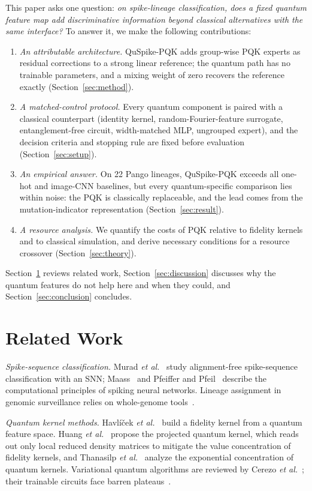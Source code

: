 \documentclass[conference]{IEEEtran}
\begin{document}
This paper asks one question: \emph{on spike-lineage classification, does a fixed quantum feature map add discriminative information beyond classical alternatives with the same interface?} To answer it, we make the following contributions:
\begin{enumerate}
    \item \textit{An attributable architecture.} QuSpike-PQK adds group-wise PQK experts as residual corrections to a strong linear reference; the quantum path has no trainable parameters, and a mixing weight of zero recovers the reference exactly (Section~\ref{sec:method}).
    \item \textit{A matched-control protocol.} Every quantum component is paired with a classical counterpart (identity kernel, random-Fourier-feature surrogate, entanglement-free circuit, width-matched MLP, ungrouped expert), and the decision criteria and stopping rule are fixed before evaluation (Section~\ref{sec:setup}).
    \item \textit{An empirical answer.} On 22 Pango lineages, QuSpike-PQK exceeds all one-hot and image-CNN baselines, but every quantum-specific comparison lies within noise: the PQK is classically replaceable, and the lead comes from the mutation-indicator representation (Section~\ref{sec:result}).
    \item \textit{A resource analysis.} We quantify the costs of PQK relative to fidelity kernels and to classical simulation, and derive necessary conditions for a resource crossover (Section~\ref{sec:theory}).
\end{enumerate}
Section~\ref{sec:related-work} reviews related work, Section~\ref{sec:discussion} discusses why the quantum features do not help here and when they could, and Section~\ref{sec:conclusion} concludes.

\section{Related Work}
\label{sec:related-work}

\textit{Spike-sequence classification.} Murad \textit{et al.}~\cite{murad2024snn} study alignment-free spike-sequence classification with an SNN; Maass~\cite{maass1997} and Pfeiffer and Pfeil~\cite{pfeiffer2018} describe the computational principles of spiking neural networks. Lineage assignment in genomic surveillance relies on whole-genome tools~\cite{rambaut2020pango,otoole2021pangolin,turakhia2021usher,aksamentov2021nextclade}.

\textit{Quantum kernel methods.} Havl\'{i}\v{c}ek \textit{et al.}~\cite{havlicek2019} build a fidelity kernel from a quantum feature space. Huang \textit{et al.}~\cite{huang2021power} propose the projected quantum kernel, which reads out only local reduced density matrices to mitigate the value concentration of fidelity kernels, and Thanasilp \textit{et al.}~\cite{thanasilp2024concentration} analyze the exponential concentration of quantum kernels. Variational quantum algorithms are reviewed by Cerezo \textit{et al.}~\cite{cerezo2021vqa}; their trainable circuits face barren plateaus~\cite{mcclean2018barren}.
\end{document}
